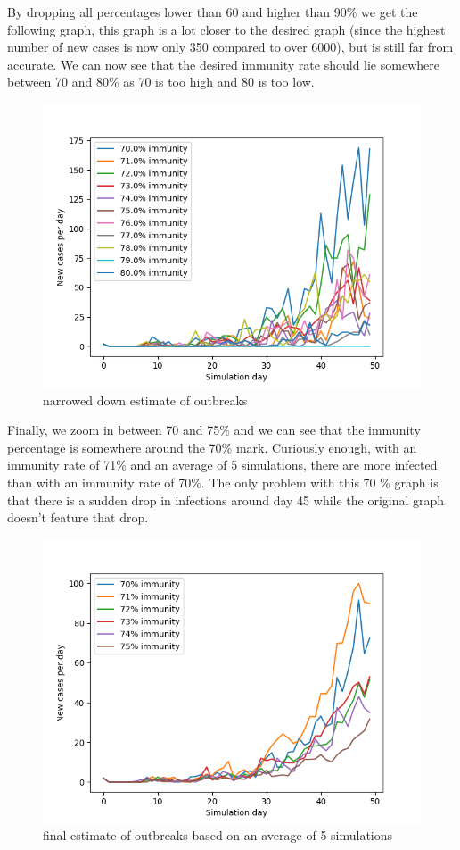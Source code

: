 \documentclass[runningheads]{llncs}
\begin{document}
\newpage
\noindent
By dropping all percentages lower than 60 and higher than 90\% we get the following graph, this graph is a lot closer to the desired graph (since the highest number of new cases is now only 350 compared to over 6000), but is still far from accurate. We can now see that the desired immunity rate should lie somewhere between 70 and 80\% as 70 is too high and 80 is too low.
\begin{figure}
	\includegraphics[width=\textwidth]{test_immunity_70-80.png}
	\caption{narrowed down estimate of outbreaks}
\end{figure}

\newpage
\noindent
Finally, we zoom in between 70 and 75\% and we can see that the immunity percentage is somewhere around the 70\% mark. Curiously enough, with an immunity rate of 71\% and an average of 5 simulations, there are more infected than with an immunity rate of 70\%. The only problem with this 70 \% graph is that there is a sudden drop in infections around day 45 while the original graph doesn't feature that drop.
\begin{figure}
	\includegraphics[width=\textwidth]{test_immunity_70-75.png}
	\caption{final estimate of outbreaks based on an average of 5 simulations}
\end{figure}
\newpage
\end{document}
